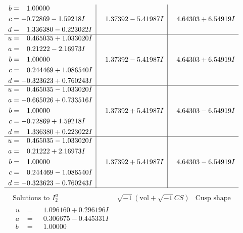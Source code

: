 \documentclass[1p]{elsarticle_modified}
\theoremstyle{definition}
\newcommand{\I}{\sqrt{-1}}
\begin{document}
$$\begin{array}{c|c|c}
\begin{aligned}
b &= \phantom{-}1.00000\phantom{ +0.000000I} \\
c &= -0.72869 - 1.59218 I \\
d &= \phantom{-}1.336380 - 0.223022 I\end{aligned}
 & \phantom{-}1.37392 - 5.41987 I & \phantom{-}4.64303 + 6.54919 I \\ \hline\begin{aligned}
u &= \phantom{-}0.465035 + 1.033020 I \\
a &= \phantom{-}0.21222 - 2.16973 I \\
b &= \phantom{-}1.00000\phantom{ +0.000000I} \\
c &= \phantom{-}0.244469 + 1.086540 I \\
d &= -0.323623 + 0.760243 I\end{aligned}
 & \phantom{-}1.37392 - 5.41987 I & \phantom{-}4.64303 + 6.54919 I \\ \hline\begin{aligned}
u &= \phantom{-}0.465035 - 1.033020 I \\
a &= -0.665026 + 0.733516 I \\
b &= \phantom{-}1.00000\phantom{ +0.000000I} \\
c &= -0.72869 + 1.59218 I \\
d &= \phantom{-}1.336380 + 0.223022 I\end{aligned}
 & \phantom{-}1.37392 + 5.41987 I & \phantom{-}4.64303 - 6.54919 I \\ \hline\begin{aligned}
u &= \phantom{-}0.465035 - 1.033020 I \\
a &= \phantom{-}0.21222 + 2.16973 I \\
b &= \phantom{-}1.00000\phantom{ +0.000000I} \\
c &= \phantom{-}0.244469 - 1.086540 I \\
d &= -0.323623 - 0.760243 I\end{aligned}
 & \phantom{-}1.37392 + 5.41987 I & \phantom{-}4.64303 - 6.54919 I\\
 \hline 
 \end{array}$$\newpage$$\begin{array}{c|c|c}  
\text{Solutions to }I^u_{2}& \I (\text{vol} + \sqrt{-1}CS) & \text{Cusp shape}\\
 \hline 
\begin{aligned}
u &= \phantom{-}1.096160 + 0.296196 I \\
a &= \phantom{-}0.306675 - 0.445331 I \\
b &= \phantom{-}1.00000\phantom{ +0.000000I} \\

\end{aligned}
\end{array}$$
\end{document}
